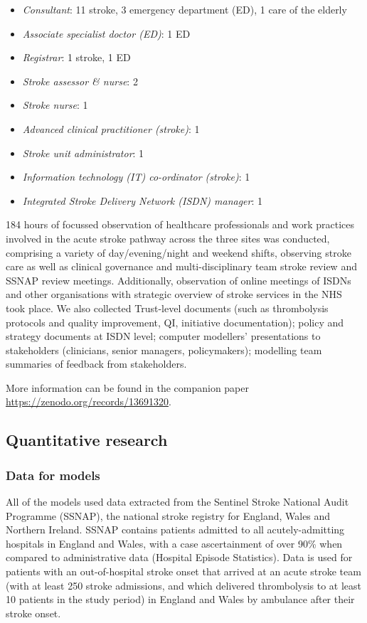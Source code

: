 \begin{itemize}
    \item \textit{Consultant}: 11 stroke, 3 emergency department (ED), 1 care of the elderly
    \item \textit{Associate specialist doctor (ED)}: 1 ED
    \item \textit{Registrar}: 1 stroke, 1 ED 
    \item \textit{Stroke assessor \& nurse}: 2
    \item \textit{Stroke nurse}: 1
    \item \textit{Advanced clinical practitioner (stroke)}: 1
    \item \textit{Stroke unit administrator}: 1
    \item \textit{Information technology (IT) co-ordinator (stroke)}: 1
    \item \textit{Integrated Stroke Delivery Network (ISDN) manager}: 1
\end{itemize}

184 hours of focussed observation of healthcare professionals and work practices involved in the acute stroke pathway across the three sites was conducted, comprising a variety of day/evening/night and weekend shifts, observing stroke care as well as clinical governance and multi-disciplinary team stroke review and SSNAP review meetings. Additionally, observation of online meetings of ISDNs and other organisations with strategic overview of stroke services in the NHS took place. We also collected Trust-level documents (such as thrombolysis protocols and quality improvement, QI, initiative documentation); policy and strategy documents at ISDN level; computer modellers’ presentations to stakeholders (clinicians, senior managers, policymakers); modelling team summaries of feedback from stakeholders.

More information can be found in the companion paper \url{https://zenodo.org/records/13691320}.

\subsection{Quantitative research}

\subsubsection{Data for models}

All of the models used data extracted from the Sentinel Stroke National Audit Programme (SSNAP), the national stroke registry for England, Wales and Northern Ireland. SSNAP contains patients admitted to all acutely-admitting hospitals in England and Wales, with a case ascertainment of over 90\% when compared to administrative data (Hospital Episode Statistics). Data is used for patients with an out-of-hospital stroke onset that arrived at an acute stroke team (with at least 250 stroke admissions, and which delivered thrombolysis to at least 10 patients in the study period) in England and Wales by ambulance after their stroke onset.


